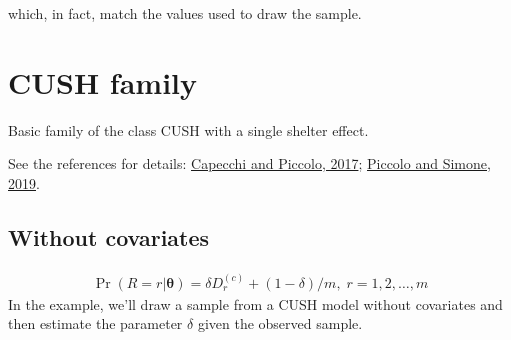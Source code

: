 \documentclass[letterpaper,10pt,english]{sphinxmanual}
\begin{document}
\sphinxAtStartPar
which, in fact, match the values used to draw the sample.


\section{CUSH family}
\label{\detokenize{manual:cush-family}}
\sphinxAtStartPar
Basic family of the class CUSH with a single shelter effect.

\sphinxAtStartPar
See the references for details: \hyperlink{cite.references:id11}{Capecchi and Piccolo, 2017}; \hyperlink{cite.references:id3}{Piccolo and Simone, 2019}.


\subsection{Without covariates}
\label{\detokenize{manual:cush-without-covariates}}\label{\detokenize{manual:id20}}
\sphinxAtStartPar
{}
\begin{equation*}
\begin{split}\Pr(R=r|\pmb\theta) = \delta D_r^{(c)} + (1-\delta)/m
,\; r=1,2,\ldots,m\end{split}
\end{equation*}
\sphinxAtStartPar
In the example, we’ll draw a sample from a CUSH model without covariates and
then estimate the parameter \(\delta\) given the observed sample.
\end{document}

